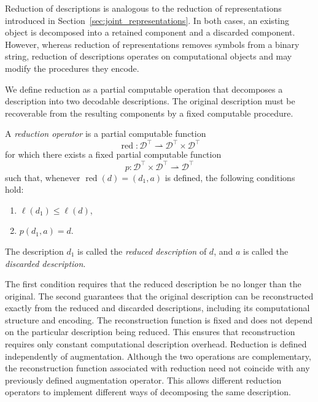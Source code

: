 Reduction of descriptions is analogous to the reduction of representations introduced in Section~\ref{sec:joint_representations}. In both cases, an existing object is decomposed into a retained component and a discarded component. However, whereas reduction of representations removes symbols from a binary string, reduction of descriptions operates on computational objects and may modify the procedures they encode.

We define reduction as a partial computable operation that decomposes a description into two decodable descriptions. The original description must be recoverable from the resulting components by a fixed computable procedure.

\begin{definition}
\label{def:reduction_descriptions}
A \emph{reduction operator} is a partial computable function
\[
\operatorname{red}: \mathcal D^\top \rightharpoonup \mathcal D^\top\times\mathcal D^\top
\]
for which there exists a fixed partial computable function
\[
p: \mathcal D^\top\times\mathcal D^\top \rightharpoonup \mathcal D^\top
\]
such that, whenever $\operatorname{red}(d)=(d_1,a)$ is defined, the following conditions hold:
\begin{enumerate}[label=\roman*]
    \item $\ell(d_1)\leq\ell(d)$,
    \item $p(d_1,a)=d$.
\end{enumerate}

The description $d_1$ is called the \emph{reduced description} of $d$, and $a$ is called the \emph{discarded description}.
\end{definition}

The first condition requires that the reduced description be no longer than the original. The second guarantees that the original description can be reconstructed exactly from the reduced and discarded descriptions, including its computational structure and encoding. The reconstruction function is fixed and does not depend on the particular description being reduced. This ensures that reconstruction requires only constant computational description overhead. Reduction is defined independently of augmentation. Although the two operations are complementary, the reconstruction function associated with reduction need not coincide with any previously defined augmentation operator. This allows different reduction operators to implement different ways of decomposing the same description.

